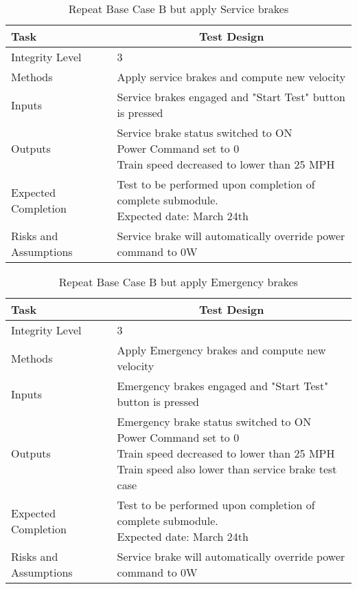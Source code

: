 \documentclass[]{article}
\begin{document}
	\begin{table}[H]
		\centering
		\caption{Repeat Base Case B but apply Service brakes}
		\begin{tabular}{|l|l|}
			\hline
			Task & \multicolumn{1}{c|}{Test Design} \\ \hline
			Integrity Level & 3 \\ \hline
			Methods & Apply service brakes and compute new velocity  \\ \hline
			Inputs &  Service brakes engaged and "Start Test" button is pressed \\ \hline
			Outputs & \parbox[t]{10cm}{ Service brake status switched to ON\\ Power Command set to 0\\ Train speed decreased to lower than 25 MPH  }\\ \hline
			Expected Completion & \parbox[t]{10cm}{Test to be performed upon completion of complete submodule.\\ Expected date: March 24th}\\ \hline
			Risks and Assumptions & Service brake will automatically override power command to 0W\\ \hline
		\end{tabular}
	\end{table}

	\begin{table}[H]
		\centering
		\caption{Repeat Base Case B but apply Emergency brakes}
		\begin{tabular}{|l|l|}
			\hline
			Task & \multicolumn{1}{c|}{Test Design} \\ \hline
			Integrity Level & 3 \\ \hline
			Methods & Apply Emergency brakes and compute new velocity  \\ \hline
			Inputs &  Emergency brakes engaged and "Start Test" button is pressed \\ \hline
			Outputs & \parbox[t]{10cm}{ Emergency brake status switched to ON\\ Power Command set to 0\\ Train speed decreased to lower than 25 MPH\\ Train speed also lower than service brake test case  }\\ \hline
			Expected Completion & \parbox[t]{10cm}{Test to be performed upon completion of complete submodule.\\ Expected date: March 24th}\\ \hline
			Risks and Assumptions & Service brake will automatically override power command to 0W\\ \hline
		\end{tabular}
	\end{table}
\end{document}
